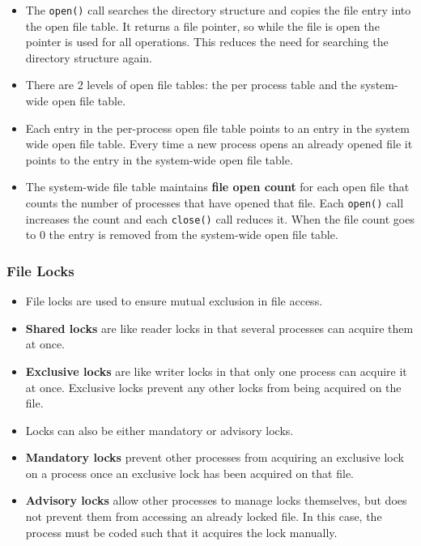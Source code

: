 \documentclass{article}
\theoremstyle{plain}
\theoremstyle{definition}
\begin{document}
\begin{itemize}
    \item The \texttt{open()} call searches the directory structure and copies the file entry into the open file table. It returns a file pointer, so while the file is open the pointer is used for all operations. This reduces the need for searching the directory structure again. 
    
    \item There are 2 levels of open file tables: the per process table and the system-wide open file table. 
    
    \item Each entry in the per-process open file table points to an entry in the system wide open file table. Every time a new process opens an already opened file it points to the entry in the system-wide open file table.
    
    \item The system-wide file table maintains \textbf{file open count} for each open file that counts the number of processes that have opened that file. Each \texttt{open()} call increases the count and each \texttt{close()} call reduces it. When the file count goes to 0 the entry is removed from the system-wide open file table. 

\end{itemize}

\subsubsection{File Locks}
\begin{itemize}
    \item File locks are used to ensure mutual exclusion in file access. 
    
    \item \textbf{Shared locks} are like reader locks in that several processes can acquire them at once. 
    
    \item \textbf{Exclusive locks} are like writer locks in that only one process can acquire it at once. Exclusive locks prevent any other locks from being acquired on the file.
    
    \item Locks can also be either mandatory or advisory locks.
    
    \item \textbf{Mandatory locks} prevent other processes from acquiring an exclusive lock on a process once an exclusive lock has been acquired on that file. 
    
    \item \textbf{Advisory locks} allow other processes to manage locks themselves, but does not prevent them from accessing an already locked file. In this case, the process must be coded such that it acquires the lock manually. 
\end{itemize}
\end{document}
